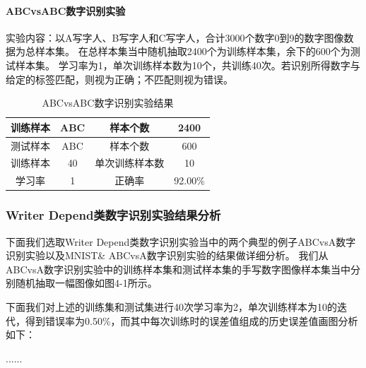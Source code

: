 \paragraph{ABCvsABC数字识别实验}
实验内容：以A写字人、B写字人和C写字人，合计3000个数字0到9的数字图像数据为总样本集。
在总样本集当中随机抽取2400个为训练样本集，余下的600个为测试样本集。
学习率为1，单次训练样本数为10个，共训练40次。若识别所得数字与给定的标签匹配，则视为正确；不匹配则视为错误。
\begin{table}[!htbp]
    \centering
    \caption{ABCvsABC数字识别实验结果}
    \begin{tabular}[\textwidth]{c|c|c|c}
        \hline
        训练样本 & ABC & 样本个数 & 2400 \\
        \hline
        测试样本 & ABC & 样本个数 & 600 \\
        \hline
        训练样本 & 40 & 单次训练样本数 & 10 \\
        \hline
        学习率 & 1 & 正确率 & 92.00\% \\
        \hline
    \end{tabular}
\end{table}

\subsubsection{Writer Depend类数字识别实验结果分析}
下面我们选取Writer Depend类数字识别实验当中的两个典型的例子ABCvsA数字识别实验以及MNIST\& ABCvsA数字识别实验的结果做详细分析。
我们从ABCvsA数字识别实验中的训练样本集和测试样本集的手写数字图像样本集当中分别随机抽取一幅图像如图4-1所示。

下面我们对上述的训练集和测试集进行40次学习率为2，单次训练样本为10的迭代，得到错误率为0.50\%，而其中每次训练时的误差值组成的历史误差值画图分析如下：

......

